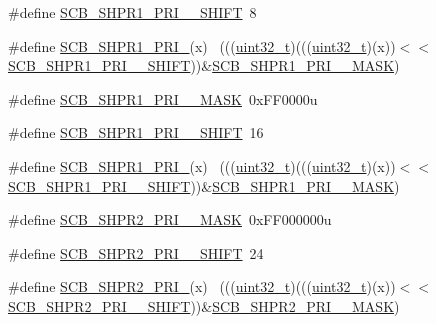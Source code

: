 \begin{DoxyCompactItemize}
\item 
\#define \hyperlink{group___s_c_b___register___masks_ga0e84aa13b2569cf65afe8bdacda74219}{S\+C\+B\+\_\+\+S\+H\+P\+R1\+\_\+\+P\+R\+I\+\_\+\_\+\+S\+H\+I\+FT}~8
\item 
\#define \hyperlink{group___s_c_b___register___masks_ga126794030c25da1900bdacb7251f95a4}{S\+C\+B\+\_\+\+S\+H\+P\+R1\+\_\+\+P\+R\+I\+\_}(x)                                          ~(((\hyperlink{_p_e___types_8h_a33594304e786b158f3fb30289278f5af}{uint32\+\_\+t})(((\hyperlink{_p_e___types_8h_a33594304e786b158f3fb30289278f5af}{uint32\+\_\+t})(x))$<$$<$\hyperlink{group___s_c_b___register___masks_ga0e84aa13b2569cf65afe8bdacda74219}{S\+C\+B\+\_\+\+S\+H\+P\+R1\+\_\+\+P\+R\+I\+\_\+\_\+\+S\+H\+I\+FT}))\&\hyperlink{group___s_c_b___register___masks_gae6540ba850a3a5e3a9d6f4c41589dc02}{S\+C\+B\+\_\+\+S\+H\+P\+R1\+\_\+\+P\+R\+I\+\_\+\_\+\+M\+A\+SK})
\item 
\#define \hyperlink{group___s_c_b___register___masks_gadfdffea384a30b01c4fbb098a77532b6}{S\+C\+B\+\_\+\+S\+H\+P\+R1\+\_\+\+P\+R\+I\+\_\+\_\+\+M\+A\+SK}~0x\+F\+F0000u
\item 
\#define \hyperlink{group___s_c_b___register___masks_gac39687ecdce013f219034bf544d48bf8}{S\+C\+B\+\_\+\+S\+H\+P\+R1\+\_\+\+P\+R\+I\+\_\+\_\+\+S\+H\+I\+FT}~16
\item 
\#define \hyperlink{group___s_c_b___register___masks_gaf117bca49fd273596094ec3bde093bb2}{S\+C\+B\+\_\+\+S\+H\+P\+R1\+\_\+\+P\+R\+I\+\_}(x)                                          ~(((\hyperlink{_p_e___types_8h_a33594304e786b158f3fb30289278f5af}{uint32\+\_\+t})(((\hyperlink{_p_e___types_8h_a33594304e786b158f3fb30289278f5af}{uint32\+\_\+t})(x))$<$$<$\hyperlink{group___s_c_b___register___masks_gac39687ecdce013f219034bf544d48bf8}{S\+C\+B\+\_\+\+S\+H\+P\+R1\+\_\+\+P\+R\+I\+\_\+\_\+\+S\+H\+I\+FT}))\&\hyperlink{group___s_c_b___register___masks_gadfdffea384a30b01c4fbb098a77532b6}{S\+C\+B\+\_\+\+S\+H\+P\+R1\+\_\+\+P\+R\+I\+\_\+\_\+\+M\+A\+SK})
\item 
\#define \hyperlink{group___s_c_b___register___masks_ga3d791e5cf57bac7bf773150ba1f0683e}{S\+C\+B\+\_\+\+S\+H\+P\+R2\+\_\+\+P\+R\+I\+\_\+\_\+\+M\+A\+SK}~0x\+F\+F000000u
\item 
\#define \hyperlink{group___s_c_b___register___masks_ga4ccb3e607c07307c5ee1c749ff8da4ca}{S\+C\+B\+\_\+\+S\+H\+P\+R2\+\_\+\+P\+R\+I\+\_\+\_\+\+S\+H\+I\+FT}~24
\item 
\#define \hyperlink{group___s_c_b___register___masks_gafb1a543618040a0c1cde2d050554e99b}{S\+C\+B\+\_\+\+S\+H\+P\+R2\+\_\+\+P\+R\+I\+\_}(x)                                        ~(((\hyperlink{_p_e___types_8h_a33594304e786b158f3fb30289278f5af}{uint32\+\_\+t})(((\hyperlink{_p_e___types_8h_a33594304e786b158f3fb30289278f5af}{uint32\+\_\+t})(x))$<$$<$\hyperlink{group___s_c_b___register___masks_ga4ccb3e607c07307c5ee1c749ff8da4ca}{S\+C\+B\+\_\+\+S\+H\+P\+R2\+\_\+\+P\+R\+I\+\_\+\_\+\+S\+H\+I\+FT}))\&\hyperlink{group___s_c_b___register___masks_ga3d791e5cf57bac7bf773150ba1f0683e}{S\+C\+B\+\_\+\+S\+H\+P\+R2\+\_\+\+P\+R\+I\+\_\+\_\+\+M\+A\+SK})
$$
\end{DoxyCompactItemize}
